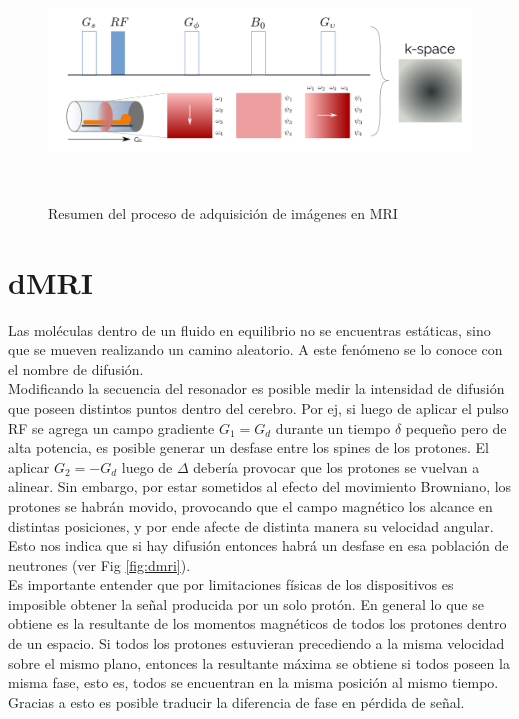 \begin{figure}[h!]
                                                                                                                        
\begin{minipage}[b]{\textwidth}
    \includegraphics[width=\textwidth]{img/kspace.png}
    \caption{Resumen del proceso de adquisici\'on de im\'agenes en MRI}
    \label{fig:kspace}
\end{minipage} ~

\end{figure}  



\section{dMRI}

Las mol\'eculas dentro de un fluido en equilibrio no se encuentras est\'aticas,
sino que se mueven realizando un camino aleatorio. A este fen\'omeno se lo 
conoce con el nombre de difusi\'on. \\

Modificando la secuencia del resonador es posible medir la intensidad de 
difusi\'on que poseen distintos puntos dentro del cerebro. Por ej, si luego de
aplicar el pulso RF se agrega un campo gradiente $G_1=G_d$ durante un tiempo $\delta$
peque\~no pero de alta potencia, es posible generar un desfase entre los
spines de los protones. El aplicar $G_2=-G_d$ luego de $\Delta$ deber\'ia provocar
que los protones se vuelvan a alinear. Sin embargo, por estar sometidos al efecto
del movimiento Browniano, los protones se habr\'an movido, provocando que el campo
magn\'etico los alcance en distintas posiciones, y por ende afecte de distinta
manera su velocidad angular. Esto nos indica que si hay difusi\'on entonces habr\'a
un desfase en esa poblaci\'on de neutrones (ver Fig \ref{fig:dmri}).\\

Es importante entender que por limitaciones f\'isicas de los dispositivos es
imposible obtener la se\~nal producida por un solo prot\'on. En general lo que
se obtiene es la resultante de los momentos magn\'eticos de todos los protones
dentro de un espacio. Si todos los protones estuvieran precediendo a la misma
velocidad sobre el mismo plano, entonces la resultante m\'axima se obtiene si 
todos poseen la misma fase, esto es, todos se encuentran en la misma posici\'on 
al mismo tiempo. Gracias a esto es posible traducir la diferencia de fase
en p\'erdida de se\~nal. \\

